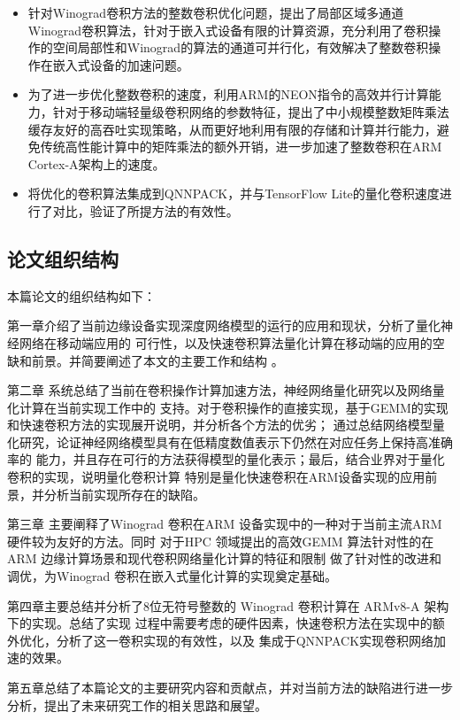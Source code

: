 \begin{itemize}

  \item 针对Winograd卷积方法的整数卷积优化问题，提出了局部区域多通道Winograd卷积算法，针对于嵌入式设备有限的计算资源，充分利用了卷积操作的空间局部性和Winograd的算法的通道可并行化，有效解决了整数卷积操作在嵌入式设备的加速问题。

  \item 为了进一步优化整数卷积的速度，利用ARM的NEON指令的高效并行计算能力，针对于移动端轻量级卷积网络的参数特征，提出了中小规模整数矩阵乘法缓存友好的高吞吐实现策略，从而更好地利用有限的存储和计算并行能力，避免传统高性能计算中的矩阵乘法的额外开销，进一步加速了整数卷积在ARM Cortex-A架构上的速度。

  \item 将优化的卷积算法集成到QNNPACK，并与TensorFlow Lite的量化卷积速度进行了对比，验证了所提方法的有效性。

\end{itemize}

\subsection{论文组织结构}

本篇论文的组织结构如下：

第一章介绍了当前边缘设备实现深度网络模型的运行的应用和现状，分析了量化神经网络在移动端应用的
可行性，以及快速卷积算法量化计算在移动端的应用的空缺和前景。并简要阐述了本文的主要工作和结构 。

第二章 系统总结了当前在卷积操作计算加速方法，神经网络量化研究以及网络量化计算在当前实现工作中的
支持。对于卷积操作的直接实现，基于GEMM的实现和快速卷积方法的实现展开说明，并分析各个方法的优劣；
通过总结网络模型量化研究，论证神经网络模型具有在低精度数值表示下仍然在对应任务上保持高准确率的
能力，并且存在可行的方法获得模型的量化表示；最后，结合业界对于量化卷积的实现，说明量化卷积计算
特别是量化快速卷积在ARM设备实现的应用前景，并分析当前实现所存在的缺陷。

第三章 主要阐释了Winograd 卷积在ARM 设备实现中的一种对于当前主流ARM硬件较为友好的方法。同时
对于HPC 领域提出的高效GEMM 算法针对性的在ARM 边缘计算场景和现代卷积网络量化计算的特征和限制
做了针对性的改进和调优，为Winograd 卷积在嵌入式量化计算的实现奠定基础。

第四章主要总结并分析了8位无符号整数的 Winograd 卷积计算在 ARMv8-A 架构下的实现。总结了实现
过程中需要考虑的硬件因素，快速卷积方法在实现中的额外优化，分析了这一卷积实现的有效性，以及
集成于QNNPACK实现卷积网络加速的效果。

第五章总结了本篇论文的主要研究内容和贡献点，并对当前方法的缺陷进行进一步分析，提出了未来研究工作的相关思路和展望。
